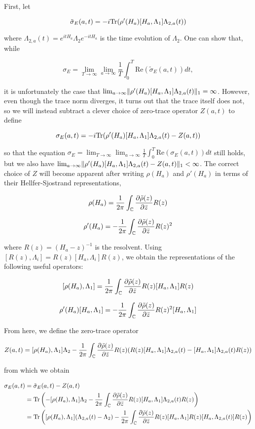 \documentclass[12pt, letterpaper]{article}
\begin{document}
First, let 

\[\tilde{\sigma}_E(a,t) = -i\text{Tr}(\rho'(H_a)[H_a,\Lambda_1]\Lambda_{2,a}(t))\]

where $\Lambda_{2,a}(t) = e^{itH_a}\Lambda_2 e^{-itH_a}$ is the time evolution of $\Lambda_2$. One can show that, while 

\[\sigma_E = \lim_{T\to\infty}\lim_{a\to\infty} \frac{1}{T}\int_0^T \text{Re}(\tilde{\sigma}_E(a,t))dt,\]

it is unfortunately the case that $\lim_{a\to\infty}\lVert \rho'(H_a)[H_a,\Lambda_1]\Lambda_{2,a}(t) \rVert_1 = \infty$. However, even though the trace norm diverges, it turns out that the trace itself does not, so we will instead subtract a clever choice of zero-trace operator $Z(a,t)$ to define

\[\sigma_E(a,t) = -i\text{Tr}(\rho'(H_a)[H_a,\Lambda_1]\Lambda_{2,a}(t)-Z(a,t))\]

so that the equation $\sigma_E = \lim_{T\to\infty}\lim_{a\to\infty} \frac{1}{T}\int_0^T \text{Re}(\sigma_E(a,t))dt$ still holds, but we also have $\lim_{a\to\infty}\lVert \rho'(H_a)[H_a,\Lambda_1]\Lambda_{2,a}(t) - Z(a,t) \rVert_1 < \infty$. The correct choice of $Z$ will become apparent after writing $\rho(H_a)$ and $\rho'(H_a)$ in terms of their Hellfer-Sjostrand representations,

\[\rho(H_a) = \frac{1}{2\pi} \int_{\mathbb{C}} \frac{\partial \tilde{\rho}(z)}{\partial \bar{z}} R(z)\]

\[\rho'(H_a) = -\frac{1}{2\pi}\int_{\mathbb{C}} \frac{\partial \tilde{\rho}(z)}{\partial \bar{z}} R(z)^2\]

where $R(z) = (H_a - z)^{-1}$ is the resolvent. Using $[R(z),\Lambda_i] = R(z)[H_a,\Lambda_i]R(z)$, we obtain the representations of the following useful operators:

\[[\rho(H_a),\Lambda_1] = \frac{1}{2\pi} \int_{\mathbb{C}} \frac{\partial \tilde{\rho}(z)}{\partial \bar{z}} R(z)[H_a,\Lambda_1]R(z)\]

\[\rho'(H_a)[H_a,\Lambda_1] = -\frac{1}{2\pi} \int_{\mathbb{C}} \frac{\partial \tilde{\rho}(z)}{\partial \bar{z}} R(z)^2[H_a,\Lambda_1]\]

From here, we define the zero-trace operator

\[Z(a,t) = [\rho(H_a),\Lambda_1]\Lambda_2 - \frac{1}{2\pi} \int_{\mathbb{C}} \frac{\partial \tilde{\rho}(z)}{\partial \bar{z}} R(z)(R(z)[H_a,\Lambda_1]\Lambda_{2,a}(t) - [H_a,\Lambda_1]\Lambda_{2,a}(t)R(z))\]

from which we obtain

\[\begin{aligned}
\sigma_E(a,t) &= \tilde{\sigma}_E(a,t) - Z(a,t)\\
&= \text{Tr}\left(-[\rho(H_a),\Lambda_1]\Lambda_2 - \frac{1}{2\pi}\int_{\mathbb{C}} \frac{\partial \tilde{\rho}(z)}{\partial \bar{z}}R(z)[H_a,\Lambda_1]\Lambda_{2,a}(t)R(z)\right)\\
&= \text{Tr}\left([\rho(H_a),\Lambda_1](\Lambda_{2,a}(t)-\Lambda_2) - \frac{1}{2\pi}\int_{\mathbb{C}}\frac{\partial \tilde{\rho}(z)}{\partial \bar{z}}R(z)[H_a,\Lambda_1]R(z)[H_a,\Lambda_{2,a}(t)]R(z)\right)
\end{aligned}\]
\end{document}
